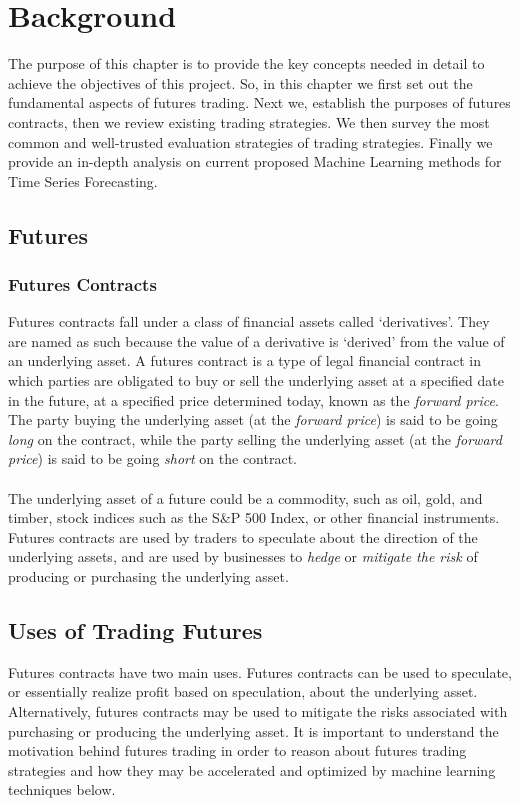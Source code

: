 \chapter{Background}

The purpose of this chapter is to provide the key concepts needed in detail to achieve the objectives of this project. So, in this chapter we first set out the fundamental aspects of futures trading. Next we, establish the purposes of futures contracts, then we review existing trading strategies. We then survey the most common and well-trusted evaluation strategies of trading strategies. Finally we provide an in-depth analysis on current proposed Machine Learning methods for Time Series Forecasting.

\section{Futures}
\subsection{Futures Contracts}
Futures contracts fall under a class of financial assets called `derivatives'. They are named as such because the value of a derivative is `derived' from the value of an underlying asset. A futures contract is a type of legal financial contract in which parties are obligated to buy or sell the underlying asset at a specified date in the future, at a specified price determined today, known as the \emph{forward price}. The party buying the underlying asset (at the \emph{forward price}) is said to be going \emph{long} on the contract, while the party selling the underlying asset (at the \emph{forward price}) is said to be going \emph{short} on the contract. \\ \\
The underlying asset of a future could be a commodity, such as oil, gold, and timber, stock indices such as the S\&P 500 Index, or other financial instruments. Futures contracts are used by traders to speculate about the direction of the underlying assets, and are used by businesses to \emph{hedge} or \emph{mitigate the risk} of producing or purchasing the underlying asset. \cite{jhull2017}

\section{Uses of Trading Futures}
Futures contracts have two main uses. Futures contracts can be used to speculate, or essentially realize profit based on speculation, about the underlying asset. Alternatively, futures contracts may be used to mitigate the risks associated with purchasing or producing the underlying asset. It is important to understand the motivation behind futures trading in order to reason about futures trading strategies and how they may be accelerated and optimized by machine learning techniques below.
